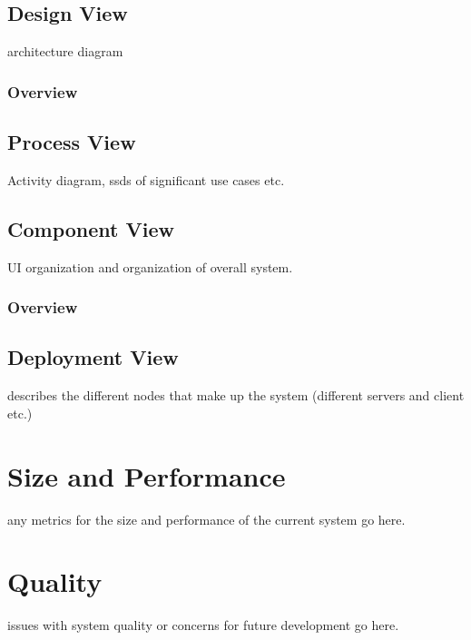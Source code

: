 \documentclass[11pt]{article}
\begin{document}
\subsection{Design View}
architecture diagram
\subsubsection{Overview}
\subsection{Process View}
Activity diagram, ssds of significant use cases etc.
\subsection{Component View}
UI organization and organization of overall system.
\subsubsection{Overview}
\subsection{Deployment View}
describes the different nodes that make up the system (different servers and client etc.)
\section{Size and Performance}
any metrics for the size and performance of the current system go here.
\section{Quality}
issues with system quality or concerns for future development go here.
\end{document}
